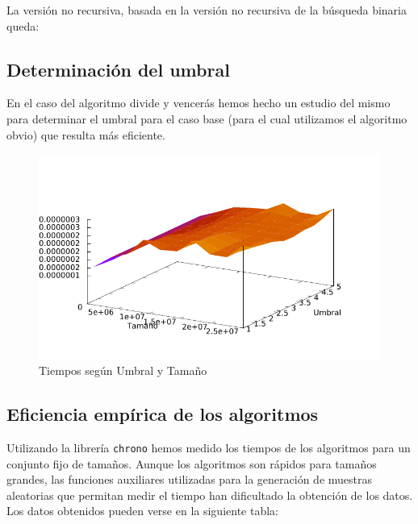 La versión no recursiva, basada en la versión no recursiva de la búsqueda binaria queda:




\subsection{Determinación del umbral}

En el caso del algoritmo divide y vencerás hemos hecho un estudio del mismo para determinar el umbral para el caso base (para el cual utilizamos el algoritmo obvio) que resulta más eficiente.


\begin{figure}[H]\includegraphics[width=13cm]{img/umbral_posicion.pdf} \centering
	\caption{Tiempos según Umbral y Tamaño}\end{figure}

\subsection{Eficiencia empírica de los algoritmos}

Utilizando la librería \texttt{chrono} hemos medido los tiempos de los algoritmos para un conjunto fijo de tamaños. Aunque los algoritmos son rápidos para tamaños grandes, las funciones auxiliares utilizadas para la generación de muestras aleatorias que permitan medir el tiempo han dificultado la obtención de los datos. Los datos obtenidos pueden verse en la siguiente tabla:

